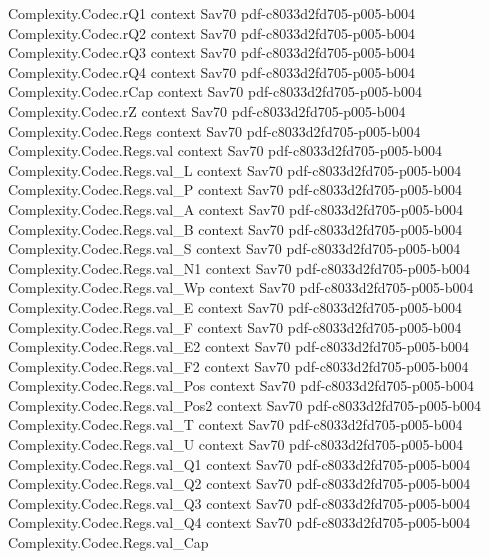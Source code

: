 \begin{theorem}
\proofstep
  {Complexity.Codec.rQ1}
  {context}
  {Sav70}
  {pdf-c8033d2fd705-p005-b004}
\proofstep
  {Complexity.Codec.rQ2}
  {context}
  {Sav70}
  {pdf-c8033d2fd705-p005-b004}
\proofstep
  {Complexity.Codec.rQ3}
  {context}
  {Sav70}
  {pdf-c8033d2fd705-p005-b004}
\proofstep
  {Complexity.Codec.rQ4}
  {context}
  {Sav70}
  {pdf-c8033d2fd705-p005-b004}
\proofstep
  {Complexity.Codec.rCap}
  {context}
  {Sav70}
  {pdf-c8033d2fd705-p005-b004}
\proofstep
  {Complexity.Codec.rZ}
  {context}
  {Sav70}
  {pdf-c8033d2fd705-p005-b004}
\proofstep
  {Complexity.Codec.Regs}
  {context}
  {Sav70}
  {pdf-c8033d2fd705-p005-b004}
\proofstep
  {Complexity.Codec.Regs.val}
  {context}
  {Sav70}
  {pdf-c8033d2fd705-p005-b004}
\proofstep
  {Complexity.Codec.Regs.val_L}
  {context}
  {Sav70}
  {pdf-c8033d2fd705-p005-b004}
\proofstep
  {Complexity.Codec.Regs.val_P}
  {context}
  {Sav70}
  {pdf-c8033d2fd705-p005-b004}
\proofstep
  {Complexity.Codec.Regs.val_A}
  {context}
  {Sav70}
  {pdf-c8033d2fd705-p005-b004}
\proofstep
  {Complexity.Codec.Regs.val_B}
  {context}
  {Sav70}
  {pdf-c8033d2fd705-p005-b004}
\proofstep
  {Complexity.Codec.Regs.val_S}
  {context}
  {Sav70}
  {pdf-c8033d2fd705-p005-b004}
\proofstep
  {Complexity.Codec.Regs.val_N1}
  {context}
  {Sav70}
  {pdf-c8033d2fd705-p005-b004}
\proofstep
  {Complexity.Codec.Regs.val_Wp}
  {context}
  {Sav70}
  {pdf-c8033d2fd705-p005-b004}
\proofstep
  {Complexity.Codec.Regs.val_E}
  {context}
  {Sav70}
  {pdf-c8033d2fd705-p005-b004}
\proofstep
  {Complexity.Codec.Regs.val_F}
  {context}
  {Sav70}
  {pdf-c8033d2fd705-p005-b004}
\proofstep
  {Complexity.Codec.Regs.val_E2}
  {context}
  {Sav70}
  {pdf-c8033d2fd705-p005-b004}
\proofstep
  {Complexity.Codec.Regs.val_F2}
  {context}
  {Sav70}
  {pdf-c8033d2fd705-p005-b004}
\proofstep
  {Complexity.Codec.Regs.val_Pos}
  {context}
  {Sav70}
  {pdf-c8033d2fd705-p005-b004}
\proofstep
  {Complexity.Codec.Regs.val_Pos2}
  {context}
  {Sav70}
  {pdf-c8033d2fd705-p005-b004}
\proofstep
  {Complexity.Codec.Regs.val_T}
  {context}
  {Sav70}
  {pdf-c8033d2fd705-p005-b004}
\proofstep
  {Complexity.Codec.Regs.val_U}
  {context}
  {Sav70}
  {pdf-c8033d2fd705-p005-b004}
\proofstep
  {Complexity.Codec.Regs.val_Q1}
  {context}
  {Sav70}
  {pdf-c8033d2fd705-p005-b004}
\proofstep
  {Complexity.Codec.Regs.val_Q2}
  {context}
  {Sav70}
  {pdf-c8033d2fd705-p005-b004}
\proofstep
  {Complexity.Codec.Regs.val_Q3}
  {context}
  {Sav70}
  {pdf-c8033d2fd705-p005-b004}
\proofstep
  {Complexity.Codec.Regs.val_Q4}
  {context}
  {Sav70}
  {pdf-c8033d2fd705-p005-b004}
\proofstep
  {Complexity.Codec.Regs.val_Cap}

\end{theorem}
